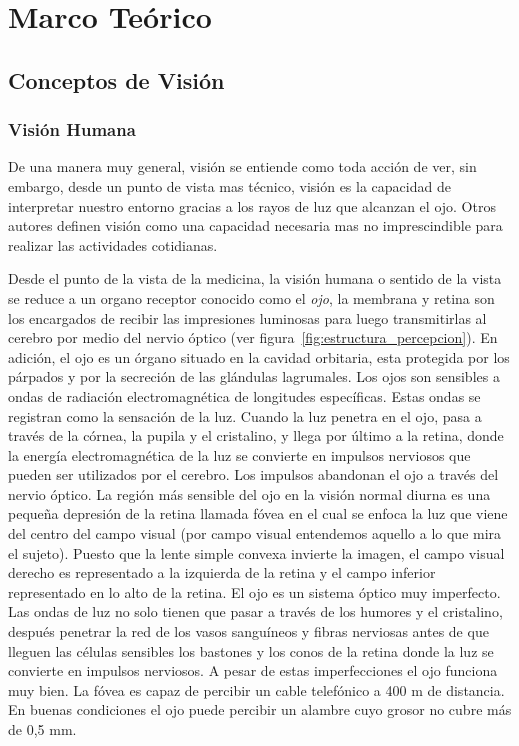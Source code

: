 \chapter{Marco Teórico}
\section{Conceptos de Visión}

\subsection{Visión Humana}
De una manera muy general, visión se entiende como toda acción de ver, sin embargo, desde un punto de vista mas técnico, visión es la capacidad de interpretar nuestro entorno gracias a los rayos de luz que alcanzan el ojo. Otros autores definen visión como una capacidad necesaria mas no imprescindible para realizar las actividades cotidianas.

Desde el punto de la vista de la medicina, la visión humana o sentido de la vista se reduce a un organo receptor conocido como el \textit{ojo}, la membrana y retina son los encargados de recibir las impresiones luminosas para luego transmitirlas al cerebro por medio del nervio óptico (ver figura~\ref{fig:estructura_percepcion}). En adición, el ojo es un órgano situado en la cavidad orbitaria, esta protegida por los párpados y por la secreción de las glándulas lagrumales. Los ojos son sensibles a ondas de radiación electromagnética de longitudes específicas. Estas ondas se registran como la sensación de la luz. Cuando la luz penetra en el ojo, pasa a través de la córnea, la pupila y el cristalino, y llega por último a la retina, donde la energía electromagnética de la luz se convierte en impulsos nerviosos que pueden ser utilizados por el cerebro. Los impulsos abandonan el ojo a través del nervio
óptico. La región más sensible del ojo en la visión normal diurna es una pequeña depresión de la retina llamada fóvea en el cual se enfoca la luz que viene del centro del campo visual (por campo visual entendemos aquello a lo que mira el sujeto). Puesto que la lente simple convexa invierte la imagen, el campo visual derecho es representado a la izquierda de la retina y el campo inferior representado en lo alto de la retina. El ojo es un sistema óptico muy imperfecto. Las ondas de luz no solo tienen que pasar a través de los humores y el cristalino, después penetrar la red de los vasos sanguíneos y fibras nerviosas antes de que lleguen las células sensibles los bastones y los conos de la retina donde la luz se convierte en impulsos nerviosos. A pesar de estas imperfecciones el ojo funciona muy bien. La fóvea es capaz de percibir un cable telefónico a 400 m de distancia. En buenas condiciones el ojo puede percibir un alambre cuyo grosor no cubre más de 0,5 mm.

